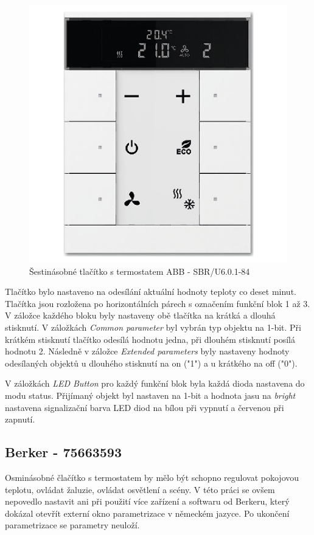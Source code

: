 \begin{figure}[!ht]
  \begin{center}
    \includegraphics[scale=1.5]{obrazky/ABB.jpg}
  \end{center}
  \caption[Šestinásobné tlačítko s termostatem ABB - SBR/U6.0.1-84 \cite{ABB}]{Šestinásobné tlačítko s termostatem ABB - SBR/U6.0.1-84 \cite{ABB}}
  \label{fig:Šestinásobné tlačítko s termostatem ABB SBR/U6.0.1-84}
\end{figure}

\newpage Tlačítko bylo nastaveno na odesílání aktuální hodnoty teploty co deset minut. Tlačítka jsou rozložena po horizontálních párech s označením funkční blok 1 až 3. V záložce každého bloku byly nastaveny obě tlačítka na krátká a dlouhá stisknutí. V záložkách  \textit{Common parameter} byl vybrán typ objektu na 1-bit. Při krátkém stisknutí tlačítko odesílá hodnotu jedna, při dlouhém stisknutí posílá hodnotu 2. Následně v záložce \textit{Extended parameters} byly nastaveny hodnoty odesílaných objektů u dlouhého stisknutí na on ("1") a u krátkého na off ("0").

V záložkách \textit{LED Button} pro každý funkční blok byla každá dioda nastavena do modu status. Přijímaný objekt byl nastaven na 1-bit a hodnota jasu na \textit{bright} nastavena signalizační barva LED diod na bílou při vypnutí a červenou při zapnutí. 

\subsection{Berker - 75663593}
Osminásobné člačítko s termostatem by mělo být schopno regulovat pokojovou teplotu, ovládat žaluzie, ovládat osvětlení a scény. V této práci se ovšem nepovedlo nastavit ani při použití více zařízení a softwaru od Berkeru, který dokázal otevřít externí okno parametrizace v německém jazyce. Po ukončení parametrizace se parametry neuloží. \cite{Berker}

